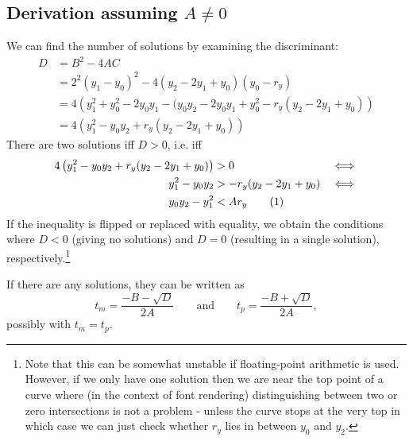 \documentclass[11pt, a4paper]{article}
\newcommand{\numberhere}{\stepcounter{equation}\tag{\theequation}}
\begin{document}
\subsection{Derivation assuming $A \neq 0$}
We can find the number of solutions by examining the discriminant:
\begin{align*}
D &= B^2-4AC\\
&= 2^2(y_1 - y_0)^2-4(y_2 - 2y_1 + y_0)(y_0 - r_y)\\
&= 4\left(y_1^2 +y_0^2-2y_0y_1-(y_0y_2 - 2y_0y_1 + y_0^2- r_y(y_2 - 2y_1 + y_0)\right)\\
&= 4\left(y_1^2 - y_0y_2 + r_y(y_2 - 2y_1 + y_0)\right)
\end{align*}
There are two solutions iff $D > 0$, i.e. iff
\begin{align*}
4\left(y_1^2 - y_0y_2 + r_y(y_2 - 2y_1 + y_0)\right) &> 0&\iff\\
y_1^2 - y_0y_2 &> -r_y(y_2 - 2y_1 + y_0)&\iff\\
y_0y_2-y_1^2 &< Ar_y\numberhere\label{eq:posdisc}
\end{align*}
If the inequality is flipped or replaced with equality, we obtain the conditions where $D < 0$ (giving no solutions) and $D = 0$ (resulting in a single solution), respectively.\footnote{Note that this can be somewhat unstable if floating-point arithmetic is used. However, if we only have one solution then we are near the top point of a curve where (in the context of font rendering) distinguishing between two or zero intersections is not a problem - unless the curve stops at the very top in which case we can just check whether $r_y$ lies in between $y_0$ and $y_2$.}

If there are any solutions, they can be written as
\begin{equation}
\label{eq:ysolformula}
t_m = \frac{-B-\sqrt{D}}{2A}\qquad\text{and}\qquad t_p = \frac{-B+\sqrt{D}}{2A},
\end{equation}
possibly with $t_m = t_p$.
\end{document}
